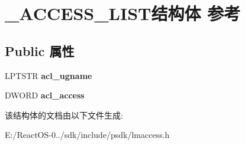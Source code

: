 \hypertarget{struct___a_c_c_e_s_s___l_i_s_t}{}\section{\+\_\+\+A\+C\+C\+E\+S\+S\+\_\+\+L\+I\+S\+T结构体 参考}
\label{struct___a_c_c_e_s_s___l_i_s_t}
\subsection*{Public 属性}
\begin{DoxyCompactItemize}
\item 
\mbox{\label{struct___a_c_c_e_s_s___l_i_s_t_a81c36adfb0dc52a8d6e5426ba9f0389e}} 
L\+P\+T\+S\+TR {\bfseries acl\+\_\+ugname}
\item 
\mbox{\label{struct___a_c_c_e_s_s___l_i_s_t_a4aaf1b3463e5d2b7ce7a4329fb0012ff}} 
D\+W\+O\+RD {\bfseries acl\+\_\+access}
\end{DoxyCompactItemize}


该结构体的文档由以下文件生成\+:\begin{DoxyCompactItemize}
\item 
E\+:/\+React\+O\+S-\/0../sdk/include/psdk/lmaccess.\+h\end{DoxyCompactItemize}
